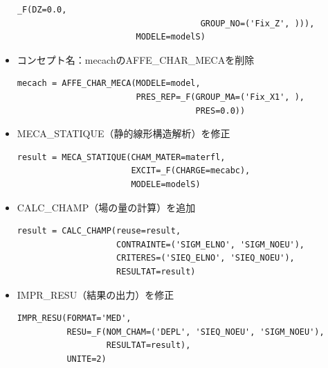 \begin{itemize}
\begin{lstlisting}[caption =機械的境界条件の割り当て,label=mecabc]
                                  _F(DZ=0.0,
                                     GROUP_NO=('Fix_Z', ))),
                        MODELE=modelS)
    \end{lstlisting}
	\item コンセプト名：mecachのAFFE\_CHAR\_MECAを削除
	      \begin{lstlisting}[caption =荷重条件（圧力条件）,label=mecach]
mecach = AFFE_CHAR_MECA(MODELE=model,
                        PRES_REP=_F(GROUP_MA=('Fix_X1', ),
                                    PRES=0.0))
    \end{lstlisting}
	\item MECA\_STATIQUE（静的線形構造解析）を修正
	      \begin{lstlisting}[caption =静的線形構造解析,label=MECA_STATIQUE]
result = MECA_STATIQUE(CHAM_MATER=materfl,
                       EXCIT=_F(CHARGE=mecabc),
                       MODELE=modelS)
    \end{lstlisting}
	\item CALC\_CHAMP（場の量の計算）を追加
	      \begin{lstlisting}[caption =場の量の計算,label=CALC_CHAMP]
result = CALC_CHAMP(reuse=result,
                    CONTRAINTE=('SIGM_ELNO', 'SIGM_NOEU'),
                    CRITERES=('SIEQ_ELNO', 'SIEQ_NOEU'),
                    RESULTAT=result)
    \end{lstlisting}
	\item IMPR\_RESU（結果の出力）を修正
	      \begin{lstlisting}[caption =結果の出力,label=IMPR_RESU]
IMPR_RESU(FORMAT='MED',
          RESU=_F(NOM_CHAM=('DEPL', 'SIEQ_NOEU', 'SIGM_NOEU'),
                  RESULTAT=result),
          UNITE=2)
    \end{lstlisting}
\end{itemize}
\clearpage
